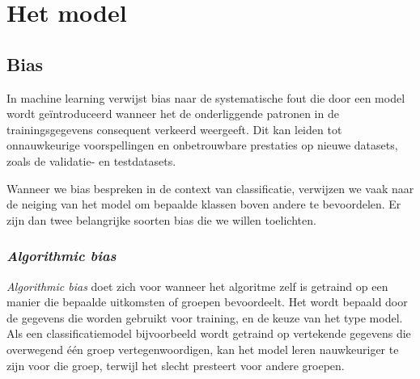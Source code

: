 \documentclass[TeamE-eindrapport]{subfiles}
\begin{document}
	
	\chapter{Het model}
	
%	
	
	\section{Bias}
	
	In machine learning verwijst bias naar de systematische fout die door een model wordt geïntroduceerd wanneer het de onderliggende patronen in de trainingsgegevens consequent verkeerd weergeeft. Dit kan leiden tot onnauwkeurige voorspellingen en onbetrouwbare prestaties op nieuwe datasets, zoals de validatie- en testdatasets.
	
	Wanneer we bias bespreken in de context van classificatie, verwijzen we vaak naar de neiging van het model om bepaalde klassen boven andere te bevoordelen. Er zijn dan twee belangrijke soorten bias die we willen toelichten.
	
	\subsection{\textit{Algorithmic bias}}
	
	\textit{Algorithmic bias} doet zich voor wanneer het algoritme zelf is getraind op een manier die bepaalde uitkomsten of groepen bevoordeelt. Het wordt bepaald door de gegevens die worden gebruikt voor training, en de keuze van het type model.
	Als een classificatiemodel bijvoorbeeld wordt getraind op vertekende gegevens die overwegend één groep vertegenwoordigen, kan het model leren nauwkeuriger te zijn voor die groep, terwijl het slecht presteert voor andere groepen. 
	
\end{document}
